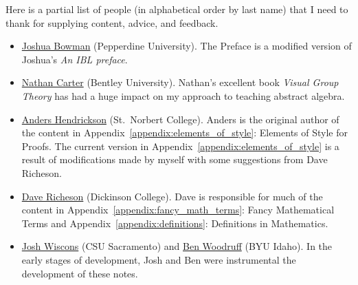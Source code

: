\documentclass[12pt,oneside]{book}
\theoremstyle{definition}
\begin{document}
\noindent Here is a partial list of people (in alphabetical order by last name) that I need to thank for supplying content, advice, and feedback.
\begin{itemize}
\item \href{https://thalestriangles.blogspot.com}{Joshua Bowman} (Pepperdine University). The Preface is a modified version of Joshua's \emph{An IBL preface}.
\item \href{https://faculty.bentley.edu/details.asp?uname=ncarter}{Nathan Carter} (Bentley University). Nathan's excellent book \emph{Visual Group Theory} has had a huge impact on my approach to teaching abstract algebra.
\item \href{http://home.snc.edu/andershendrickson/}{Anders Hendrickson} (St.~Norbert College). Anders is the original author of the content in Appendix~\ref{appendix:elements_of_style}: Elements of Style for Proofs. The current version in Appendix~\ref{appendix:elements_of_style} is a result of modifications made by myself with some suggestions from Dave Richeson.
\item \href{http://users.dickinson.edu/~richesod/}{Dave Richeson} (Dickinson College). Dave is responsible for much of the content in Appendix~\ref{appendix:fancy_math_terms}: Fancy Mathematical Terms and Appendix~\ref{appendix:definitions}: Definitions in Mathematics. 
\item \href{http://webpages.csus.edu/wiscons/}{Josh Wiscons} (CSU Sacramento) and \href{http://emp.byui.edu/woodruffb/}{Ben Woodruff} (BYU Idaho). In the early stages of development, Josh and Ben were instrumental the development of these notes.
\end{itemize}

\tableofcontents













\end{document}
